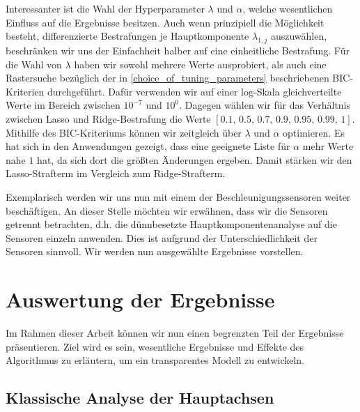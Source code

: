 Interessanter ist die Wahl der Hyperparameter $\lambda$ und $\alpha$, welche wesentlichen Einfluss auf die Ergebnisse besitzen. Auch wenn prinzipiell die Möglichkeit besteht, differenzierte Bestrafungen je Hauptkomponente $\lambda_{1,j}$ auszuwählen, beschränken wir uns der Einfachheit halber auf eine einheitliche Bestrafung. Für die Wahl von $\lambda$ haben wir sowohl mehrere Werte ausprobiert, als auch eine Rastersuche bezüglich der in \ref{choice_of_tuning_parameters} beschriebenen BIC-Kriterien durchgeführt. Dafür verwenden wir auf einer log-Skala gleichverteilte Werte im Bereich zwischen $10^{-7}$ und $10^0$. Dagegen wählen wir für das Verhältnis zwischen Lasso und Ridge-Bestrafung die Werte $[0.1,\, 0.5,\, 0.7,\, 0.9,\, 0.95,\, 0.99,\, 1]$. Mithilfe des BIC-Kriteriums können wir zeitgleich über $\lambda$ und $\alpha$ optimieren. Es hat sich in den Anwendungen gezeigt, dass eine geeignete Liste für $\alpha$ mehr Werte nahe $1$ hat, da sich dort die größten Änderungen ergeben. Damit stärken wir den Lasso-Strafterm im Vergleich zum Ridge-Strafterm.

Exemplarisch werden wir uns nun mit einem der Beschleunigungssensoren weiter beschäftigen. An dieser Stelle möchten wir erwähnen, dass wir die Sensoren getrennt betrachten, d.h. die dünnbesetzte Hauptkomponentenanalyse auf die Sensoren einzeln anwenden. Dies ist aufgrund der Unterschiedlichkeit der Sensoren sinnvoll. Wir werden nun ausgewählte Ergebnisse vorstellen. 




\section{Auswertung der Ergebnisse}
\label{evaluation}

Im Rahmen dieser Arbeit können wir nun einen begrenzten Teil der Ergebnisse präsentieren. Ziel wird es sein, wesentliche Ergebnisse und Effekte des Algorithmus zu erläutern, um ein transparentes Modell zu entwickeln.




\subsection{Klassische Analyse der Hauptachsen}


